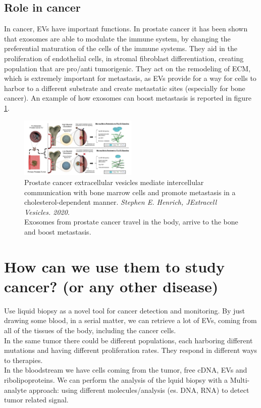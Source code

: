 \subsection{Role in cancer}
In cancer, EVs have important functions. In prostate cancer it has been shown that exosomes are able to modulate the immune system, by changing the preferential maturation of the cells of the immune systems. They aid in the proliferation of endothelial cells, in stromal fibroblast differentiation, creating population that are pro/anti tumorigenic. They act on the remodeling of ECM, which is extremely important for metastasis, as EVs provide for a way for cells to harbor to a different substrate and create metastatic sites (especially for bone cancer). An example of how exosomes can boost metastasis is reported in figure \ref{fig:cancer1}.

\begin{figure}[H]
    \centering
    \includegraphics[width=0.5\textwidth]{evs_bone.png}
    \caption{Prostate cancer extracellular vesicles mediate intercellular communication with bone marrow cells and promote metastasis in a cholesterol-dependent manner.\textit{ Stephen E. Henrich, JExtracell Vesicles. 2020}.
    \\
    Exosomes from prostate cancer travel in the body, arrive to the bone and boost metastasis. }
    \label{fig:cancer1}
\end{figure}


\section{How can we use them to study cancer? (or any other disease)}
Use liquid biopsy as a novel tool for cancer detection and monitoring. By just drawing some blood, in a serial matter, we can retrieve a lot of EVs, coming from all of the tissues of the body, including the cancer cells.
\\
In the same tumor there could be different populations, each harboring different mutations and having different proliferation rates. They respond in different ways to therapies. 
\\
In the bloodstream we have cells coming from the tumor, free cDNA, EVs and ribolipoproteins. We can perform the analysis of the lquid biopsy with a Multi-analyte approach: using different molecules/analysis (es. DNA, RNA) to detect tumor related signal.
\\

